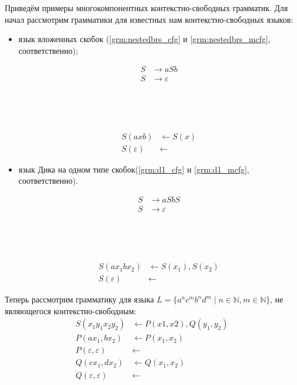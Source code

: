 Приведём примеры многокомпонентных контекстно-свободных грамматик. Для начал рассмотрим грамматики для известных нам контекстно-свободных языков:
\begin{itemize}
    \item язык вложенных скобок (\ref{grm:nestedbrs_cfg} и \ref{grm:nestedbrs_mcfg}, соответственно);\\
    \begin{minipage}[t]{0.4\textwidth}
        \begin{align}\label{grm:nestedbrs_cfg}
        S &\to a S b \nonumber \\
        S &\to \varepsilon
        \end{align}
    \end{minipage}
    ~
    \begin{minipage}[t]{0.2\textwidth}
    \end{minipage}
    ~
    \begin{minipage}[t]{0.4\textwidth}
        \begin{align}\label{grm:nestedbrs_mcfg}
        S(axb) & \leftarrow S(x) \nonumber \\
        S(\varepsilon) & \leftarrow
        \end{align}
    \end{minipage}
    \item язык Дика на одном типе скобок(\ref{grm:d1_cfg} и \ref{grm:d1_mcfg}, соответственно).\\
    \begin{minipage}[t]{0.4\textwidth}
        \begin{align}\label{grm:d1_cfg}
        S &\to a S b S \nonumber \\
        S &\to \varepsilon
        \end{align}
    \end{minipage}
    ~
    \begin{minipage}[t]{0.2\textwidth}
    \end{minipage}
    ~
    \begin{minipage}[t]{0.4\textwidth}
        \begin{align}\label{grm:d1_mcfg}
        S(ax_1bx_2) & \leftarrow S(x_1), S(x_2) \nonumber \\
        S(\varepsilon) & \leftarrow
        \end{align}
    \end{minipage}
    
\end{itemize}

Теперь рассмотрим грамматику для языка $L = \{a^nc^mb^nd^m \mid n \in \mathbb{N}, m \in \mathbb{N} \}$, не являющегося контекстно-свободным:
    \begin{align*}
        S(x_1 y_1 x_2 y_2) & \leftarrow P(x1,x2),Q(y_1,y_2) \\
        P(ax_1, bx_2) & \leftarrow P(x_1,x_2) \\
        P(\varepsilon,\varepsilon) &\leftarrow  \\
        Q(cx_1, dx_2) & \leftarrow Q(x_1,x_2) \\
        Q(\varepsilon,\varepsilon) &\leftarrow
    \end{align*}
        

